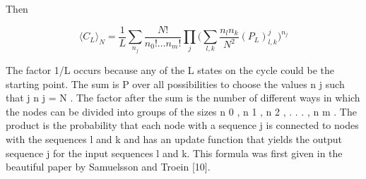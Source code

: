Then

\begin{equation}
\langle C_L\rangle_N = \frac{1}{L} \sum_{n_j} \frac{N!}{n_0! \dots n_m!} \prod_j \big(\sum_{l,k}\frac{n_ln_k}{N^2}(P_L)^j_{l,k}\big)^{n_j}
\end{equation}

The factor 1/L occurs because any of the L states on the
cycle could be the starting point. The sum is P
over all
possibilities to choose the values {n j } such that j n j =
N . The factor after the sum is the number of different
ways in which the nodes can be divided into groups of the
sizes n 0 , n 1 , n 2 , . . . , n m . The product is the probability
that each node with a sequence j is connected to nodes
with the sequences l and k and has an update function
that yields the output sequence j for the input sequences
l and k. This formula was first given in the beautiful
paper by Samuelsson and Troein [10].

